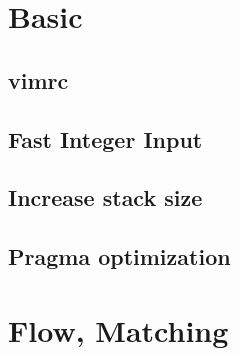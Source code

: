 \documentclass[a4paper,10pt,twocolumn,oneside]{article}
\begin{document}
\pagestyle{fancy}
\fancyfoot{}
\fancyhead[R]{\thepage}
\renewcommand{\headrulewidth}{0.4pt}
\renewcommand{\contentsname}{Contents} 

\scriptsize
\begingroup
\let\clearpage\relax
\endgroup
%
\section{Basic}
\subsection{vimrc}

% 
% 
\subsection{Fast Integer Input}

\subsection{Increase stack size}

\subsection{Pragma optimization}

% 
\section{Flow, Matching}
\end{document}
